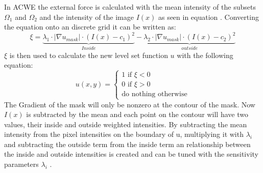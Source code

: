 In ACWE the external force is calculated with the mean intensity of the subsets $\Omega_1$ and $\Omega_2$ and the intensity of the image $I(x)$ as seen in equation . Converting the equation onto an discrete grid it can be written as: 
\begin{equation}
   \xi  = \underbrace{\lambda_{1} \cdot | \nabla u_{mask}| \cdot (I(x)-c_{1})^{2}}_{Inside}-\underbrace{\lambda_{2} \cdot|\nabla u_{mask}| \cdot (I(x)-c_{2})^{2}}_{outside}
\end{equation} 
$\xi$ is then used to calculate the new level set function $u$ with the following equation:
\begin{equation}
    u(x,y) = \begin{cases}
        1 \text{ if } \xi<0 \\
        0 \text{ if } \xi>0 \\
        \text{do nothing otherwise}
        \end{cases}
\end{equation}
The Gradient of the mask will only be nonzero at the contour of the mask. 
Now $I(x)$ is subtracted by the mean and each point on the contour will have two values, their inside and outside weighted intensities. By subtracting the mean intensity from the pixel intensities on the boundary of u, multiplying it with $\lambda_i$ and subtracting the outside term from the inside term an relationship between the inside and outside intensities is created and can be tuned with the sensitivity parameters $\lambda_i$ . 

